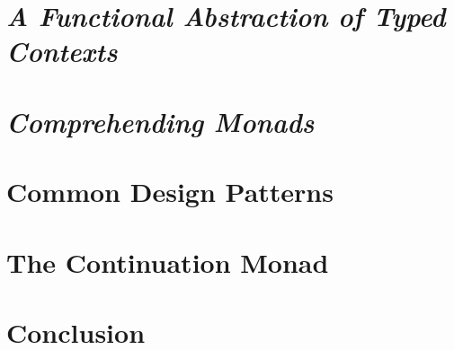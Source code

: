 \documentclass[acmsmall, nonacm, screen]{acmart}
\begin{document}
\section{{\em A Functional Abstraction of Typed Contexts}} \label{sec:danvy}

\section{{\em Comprehending Monads}} \label{sec:wadler}

\section{Common Design Patterns} \label{sec:patterns}

\section{The Continuation Monad} \label{sec:contmonad}

\section{Conclusion} \label{sec:conclusion}

\begin{acks}
\end{acks}



\end{document}

